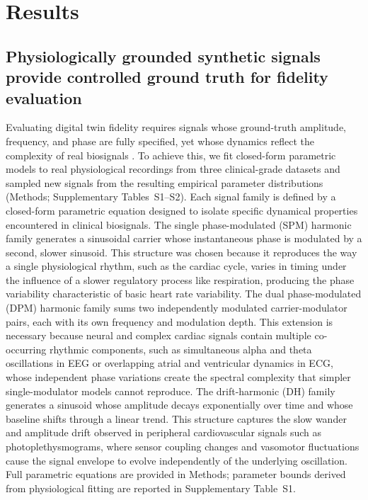\section{Results}


\subsection*{Physiologically grounded synthetic signals provide controlled ground truth for fidelity evaluation}

Evaluating digital twin fidelity requires signals whose ground-truth amplitude, frequency, and phase are fully specified, yet whose dynamics reflect the complexity of real biosignals \cite{clifford2006advanced, sornmo2005bioelectrical}. To achieve this, we fit closed-form parametric models to real physiological recordings from three clinical-grade datasets and sampled new signals from the resulting empirical parameter distributions (Methods; Supplementary Tables~S1--S2). Each signal family is defined by a closed-form parametric equation designed to isolate specific dynamical properties encountered in clinical biosignals. The single phase-modulated (SPM) harmonic family generates a sinusoidal carrier whose instantaneous phase is modulated by a second, slower sinusoid. This structure was chosen because it reproduces the way a single physiological rhythm, such as the cardiac cycle, varies in timing under the influence of a slower regulatory process like respiration, producing the phase variability characteristic of basic heart rate variability. The dual phase-modulated (DPM) harmonic family sums two independently modulated carrier-modulator pairs, each with its own frequency and modulation depth. This extension is necessary because neural and complex cardiac signals contain multiple co-occurring rhythmic components, such as simultaneous alpha and theta oscillations in EEG or overlapping atrial and ventricular dynamics in ECG, whose independent phase variations create the spectral complexity that simpler single-modulator models cannot reproduce. The drift-harmonic (DH) family generates a sinusoid whose amplitude decays exponentially over time and whose baseline shifts through a linear trend. This structure captures the slow wander and amplitude drift observed in peripheral cardiovascular signals such as photoplethysmograms, where sensor coupling changes and vasomotor fluctuations cause the signal envelope to evolve independently of the underlying oscillation. Full parametric equations are provided in Methods; parameter bounds derived from physiological fitting are reported in Supplementary Table~S1.

